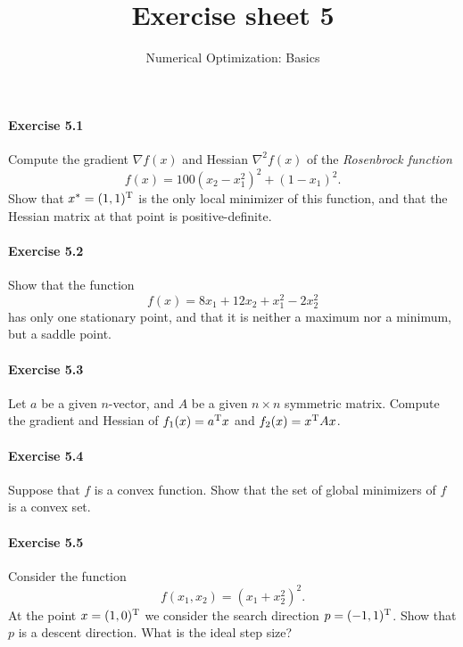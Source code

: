 
\title{Exercise sheet 5}
\subtitle{Numerical Optimization: Basics}

\maketitle

\paragraph{Exercise 5.1} %
Compute  the gradient $\nabla f(x)$ and Hessian $\nabla^2f(x)$ of the
\emph{Rosenbrock function}
\begin{equation}\label{eq:rosenbrock}
  f(x) = 100(x_2-x_1^2)^2 + (1-x_1)^2.
\end{equation}
Show that $x^*=(1,1)^{\operatorname{T}}$ is the only local minimizer of this function, and
that the Hessian matrix at that point is positive-definite.

\paragraph{Exercise 5.2} %
Show that the function
\[
  f(x) = 8x_1 + 12x_2 + x_1^2 - 2x_2^2
\]
has only one stationary point, and that it is neither a maximum nor a minimum,
but a saddle point.

\paragraph{Exercise 5.3} %
Let $a$ be a given $n$-vector, and $A$ be a given $n\times n$ symmetric matrix. Compute the
gradient and Hessian of $f_1(x) = a^{\operatorname{T}} x$ and $f_2 (x) =x^{\operatorname{T}} Ax$.


\paragraph{Exercise 5.4} %
Suppose that $f$ is a convex function. Show that the set of global minimizers
of $f$ is a convex set.

\paragraph{Exercise 5.5} %
Consider the function
\[
  f(x_1, x_2) = (x_1+x_2^2)^2.
\]
At the point $x=(1,0)^{\operatorname{T}}$ we consider the search direction $p=(-1,1)^{\operatorname{T}}$.
Show that $p$ is a descent direction. What is the ideal step size?

